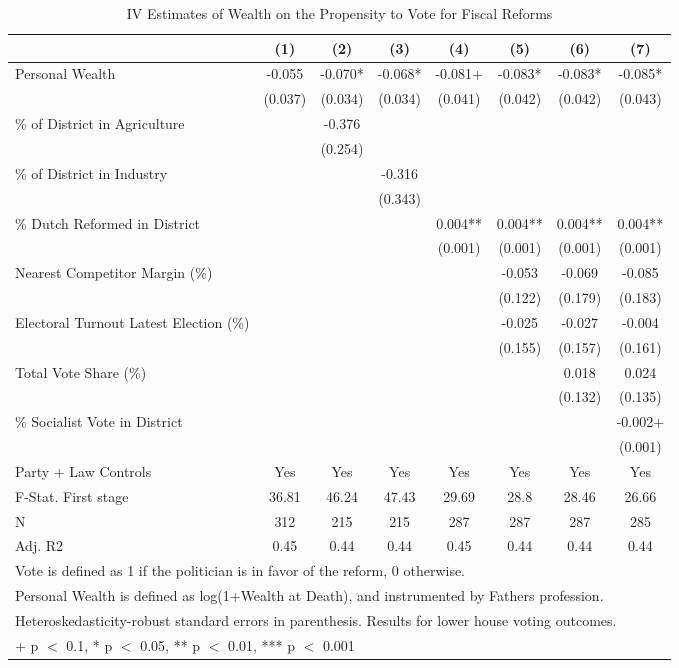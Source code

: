 \begin{table}

\caption{\label{tab:ivresults_othermodels2}IV Estimates of Wealth on the Propensity to Vote for Fiscal Reforms}
\centering
\begin{tabular}[t]{lccccccc}
\toprule
  & (1) & (2) & (3) & (4) & (5) & (6) & (7)\\
\midrule
Personal Wealth & -0.055 & -0.070* & -0.068* & -0.081+ & -0.083* & -0.083* & -0.085*\\
 & (0.037) & (0.034) & (0.034) & (0.041) & (0.042) & (0.042) & (0.043)\\
\% of District in Agriculture &  & -0.376 &  &  &  &  & \\
 &  & (0.254) &  &  &  &  & \\
\% of District in Industry &  &  & -0.316 &  &  &  & \\
 &  &  & (0.343) &  &  &  & \\
\% Dutch Reformed in District &  &  &  & 0.004** & 0.004** & 0.004** & 0.004**\\
 &  &  &  & (0.001) & (0.001) & (0.001) & (0.001)\\
Nearest Competitor Margin (\%) &  &  &  &  & -0.053 & -0.069 & -0.085\\
 &  &  &  &  & (0.122) & (0.179) & (0.183)\\
Electoral Turnout Latest Election (\%) &  &  &  &  & -0.025 & -0.027 & -0.004\\
 &  &  &  &  & (0.155) & (0.157) & (0.161)\\
Total Vote Share (\%) &  &  &  &  &  & 0.018 & 0.024\\
 &  &  &  &  &  & (0.132) & (0.135)\\
\% Socialist Vote in District &  &  &  &  &  &  & -0.002+\\
 &  &  &  &  &  &  & (0.001)\\
\midrule
Party + Law Controls & Yes & Yes & Yes & Yes & Yes & Yes & Yes\\
F-Stat. First stage & 36.81 & 46.24 & 47.43 & 29.69 & 28.8 & 28.46 & 26.66\\
N & 312 & 215 & 215 & 287 & 287 & 287 & 285\\
Adj. R2 & 0.45 & 0.44 & 0.44 & 0.45 & 0.44 & 0.44 & 0.44\\
\bottomrule
\multicolumn{8}{l}{\rule{0pt}{1em}Vote is defined as 1 if the politician is in favor of the reform, 0 otherwise.}\\
\multicolumn{8}{l}{\rule{0pt}{1em}Personal Wealth is defined as log(1+Wealth at Death), and instrumented by Fathers profession.}\\
\multicolumn{8}{l}{\rule{0pt}{1em}Heteroskedasticity-robust standard errors in parenthesis. Results for lower house voting outcomes.}\\
\multicolumn{8}{l}{\rule{0pt}{1em}+ p $<$ 0.1, * p $<$ 0.05, ** p $<$ 0.01, *** p $<$ 0.001}\\
\end{tabular}
\end{table}
